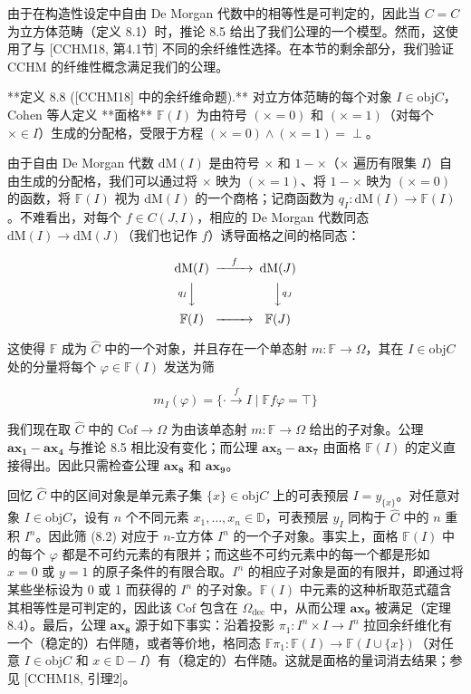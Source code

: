 \documentclass{ctexart}
\theoremstyle{plain}
\theoremstyle{definition}
\theoremstyle{definition}
\theoremstyle{definition}
\theoremstyle{definition}
\newcommand{\ax}[1]{\mathbf{ax_{#1}}}
\numberwithin{equation}{section}
\begin{document}
由于在构造性设定中自由 De Morgan 代数中的相等性是可判定的，因此当 \(C = C\) 为立方体范畴（定义 8.1）时，推论 8.5 给出了我们公理的一个模型。然而，这使用了与 [CCHM18, 第4.1节] 不同的余纤维性选择。在本节的剩余部分，我们验证 CCHM 的纤维性概念满足我们的公理。

**定义 8.8 ([CCHM18] 中的余纤维命题).** 对立方体范畴的每个对象 \(I \in \text{obj} C\)，Cohen 等人定义 **面格** \(\mathbb{F}(I)\) 为由符号 \((\times = 0)\) 和 \((\times = 1)\)（对每个 \(\times \in I\)）生成的分配格，受限于方程 \((\times = 0) \land (\times = 1) = \perp\)。

由于自由 De Morgan 代数 \(\text{dM}(I)\) 是由符号 \(\times\) 和 \(1 - \times\)（\(\times\) 遍历有限集 \(I\)）自由生成的分配格，我们可以通过将 \(\times\) 映为 \((\times = 1)\)、将 \(1 - \times\) 映为 \((\times = 0)\) 的函数，将 \(\mathbb{F}(I)\) 视为 \(\text{dM}(I)\) 的一个商格；记商函数为 \(q_I : \text{dM}(I) \to \mathbb{F}(I)\)。不难看出，对每个 \(f \in C(J, I)\)，相应的 De Morgan 代数同态 \(\text{dM}(I) \to \text{dM}(J)\)（我们也记作 \(f\)）诱导面格之间的格同态：

\[\begin{CD}
\text{dM}(I) @>f>> \text{dM}(J) \\
@V q_I VV @VV q_J V \\
\mathbb{F}(I) @>>> \mathbb{F}(J)
\end{CD}\]

这使得 \(\mathbb{F}\) 成为 \(\hat{C}\) 中的一个对象，并且存在一个单态射 \(m : \mathbb{F} \to \Omega\)，其在 \(I \in \text{obj} C\) 处的分量将每个 \(\varphi \in \mathbb{F}(I)\) 发送为筛

\[m_I(\varphi) = \{ \cdot \xrightarrow{f} I \mid \mathbb{F} f \varphi = \top \} \tag{8.2}\]

我们现在取 \(\hat{C}\) 中的 \(\text{Cof} \to \Omega\) 为由该单态射 \(m : \mathbb{F} \to \Omega\) 给出的子对象。公理 \(\ax{1}-\ax{4}\) 与推论 8.5 相比没有变化；而公理 \(\ax{5}-\ax{7}\) 由面格 \(\mathbb{F}(I)\) 的定义直接得出。因此只需检查公理 \(\ax{8}\) 和 \(\ax{9}\)。

回忆 \(\hat{C}\) 中的区间对象是单元素子集 \(\{x\} \in \text{obj} C\) 上的可表预层 \(I = y_{\{x\}}\)。对任意对象 \(I \in \text{obj} C\)，设有 \(n\) 个不同元素 \(x_1, \ldots, x_n \in \mathbb{D}\)，可表预层 \(y_I\) 同构于 \(\hat{C}\) 中的 \(n\) 重积 \(I^n\)。因此筛 (8.2) 对应于 \(n\)-立方体 \(I^n\) 的一个子对象。事实上，面格 \(\mathbb{F}(I)\) 中的每个 \(\varphi\) 都是不可约元素的有限并；而这些不可约元素中的每一个都是形如 \(x = 0\) 或 \(y = 1\) 的原子条件的有限合取。\(I^n\) 的相应子对象是面的有限并，即通过将某些坐标设为 0 或 1 而获得的 \(I^n\) 的子对象。\(\mathbb{F}(I)\) 中元素的这种析取范式蕴含其相等性是可判定的，因此该 \(\text{Cof}\) 包含在 \(\Omega_{\text{dec}}\) 中，从而公理 \(\ax{9}\) 被满足（定理 8.4）。最后，公理 \(\ax{8}\) 源于如下事实：沿着投影 \(\pi_1 : I^n \times I \to I^n\) 拉回余纤维化有一个（稳定的）右伴随，或者等价地，格同态 \(\mathbb{F} \pi_1 : \mathbb{F}(I) \to \mathbb{F}(I \cup \{x\})\)（对任意 \(I \in \text{obj} C\) 和 \(x \in \mathbb{D} - I\)）有（稳定的）右伴随。这就是面格的量词消去结果；参见 [CCHM18, 引理2]。
\end{document}
